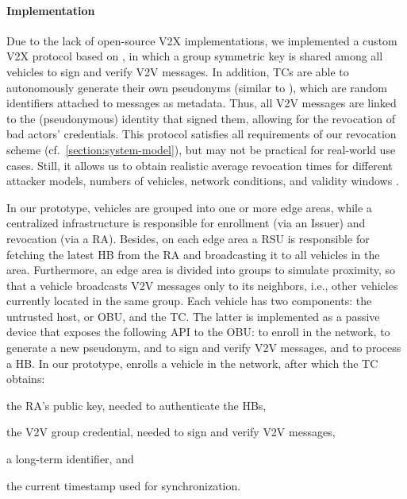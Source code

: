 \paragraph{Implementation}
%
Due to the lack of open-source \ac{V2X} implementations, we implemented a custom
\ac{V2X} protocol based on \cite{jangid2022towards}, in which a group symmetric
key is shared among all vehicles to sign and verify \ac{V2V} messages. In
addition, \acp{TC} are able to autonomously generate their own pseudonyms
(similar to \cite{whitefield2017privacy,desmoulins2019practical}), which are
random identifiers attached to messages as metadata. Thus, all \ac{V2V} messages
are linked to the (pseudonymous) identity that signed them, allowing for the
revocation of bad actors' credentials. This protocol satisfies all requirements
of our revocation scheme (cf.~\cref{section:system-model}), but may not be
practical for real-world use cases. Still, it allows us to obtain realistic
average revocation times for different attacker models, numbers of vehicles,
network conditions, and validity windows \paramtt{}.

In our prototype, vehicles are grouped into one or more edge areas, while a
centralized infrastructure is responsible for enrollment (via an Issuer) and
revocation (via a \ac{RA}). Besides, on each edge area a \ac{RSU} is responsible
for fetching the latest \ac{HB} from the \ac{RA} and broadcasting it to all
vehicles in the area. Furthermore, an edge area is divided into groups to
simulate proximity, so that a vehicle broadcasts \ac{V2V} messages only to its
neighbors, i.e., other vehicles currently located in the same group. Each
vehicle has two components: the untrusted host, or \ac{OBU}, and the \ac{TC}.
The latter is implemented as a passive device that exposes the following API to
the \ac{OBU}: \funcjoin{} to enroll in the network, \funcissue{} to generate a
new pseudonym, \funcsign{} and \funcverify{} to sign and verify \ac{V2V}
messages, and \funcheartbeat{} to process a \ac{HB}. In our prototype,
\funcjoin{} enrolls a vehicle in the network, after which the \ac{TC} obtains: %
%
\begin{paraenum}
    \item the \ac{RA}'s public key, needed to authenticate the \acp{HB},
    \item the \ac{V2V} group credential, needed to sign and verify \ac{V2V}
    messages,
    \item a long-term identifier, and
    \item the current timestamp used for synchronization.
\end{paraenum}

